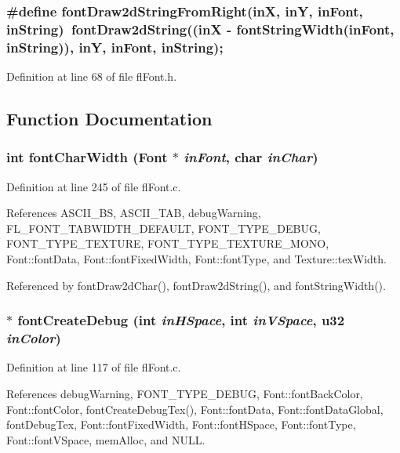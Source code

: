 \subsubsection{\setlength{\rightskip}{0pt plus 5cm}\#define font\-Draw2d\-String\-From\-Right(in\-X, in\-Y, in\-Font, in\-String)~font\-Draw2d\-String((in\-X - font\-String\-Width(in\-Font, in\-String)), in\-Y, in\-Font, in\-String);}\label{flFont_8h_6552a97d680e770552e024d3f3999ccc}




Definition at line 68 of file fl\-Font.h.

\subsection{Function Documentation}
\subsubsection{\setlength{\rightskip}{0pt plus 5cm}int font\-Char\-Width ({\bf Font} $\ast$ {\em in\-Font}, char {\em in\-Char})}\label{flFont_8h_885fc7115e929b241e957568f1e15be5}




Definition at line 245 of file fl\-Font.c.

References ASCII\_\-BS, ASCII\_\-TAB, debug\-Warning, FL\_\-FONT\_\-TABWIDTH\_\-DEFAULT, FONT\_\-TYPE\_\-DEBUG, FONT\_\-TYPE\_\-TEXTURE, FONT\_\-TYPE\_\-TEXTURE\_\-MONO, Font::font\-Data, Font::font\-Fixed\-Width, Font::font\-Type, and Texture::tex\-Width.

Referenced by font\-Draw2d\-Char(), font\-Draw2d\-String(), and font\-String\-Width().
\subsubsection{$\ast$ font\-Create\-Debug (int {\em in\-HSpace}, int {\em in\-VSpace}, u32 {\em in\-Color})}\label{flFont_8h_e88ed5efe4bc9f93200dd3645a740a89}




Definition at line 117 of file fl\-Font.c.

References debug\-Warning, FONT\_\-TYPE\_\-DEBUG, Font::font\-Back\-Color, Font::font\-Color, font\-Create\-Debug\-Tex(), Font::font\-Data, Font::font\-Data\-Global, font\-Debug\-Tex, Font::font\-Fixed\-Width, Font::font\-HSpace, Font::font\-Type, Font::font\-VSpace, mem\-Alloc, and NULL.

